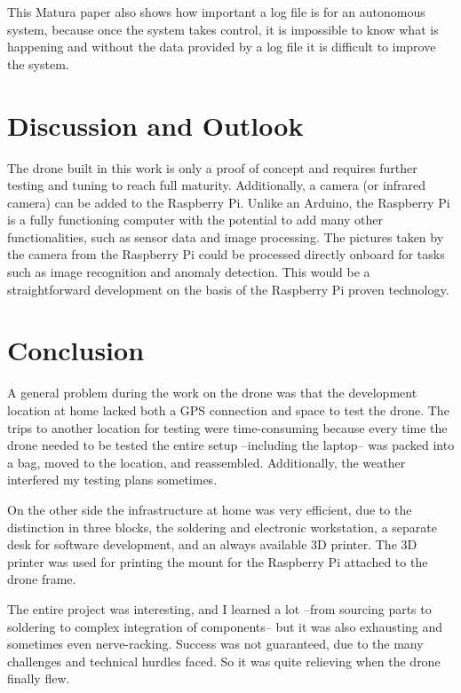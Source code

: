 \documentclass[svgnames]{article}
\begin{document}
	This Matura paper also shows how important a log file is for an autonomous system, because once the system takes  control, it is impossible to know what is happening and without the data provided by a log file it is difficult to improve the system.
	
	\section{Discussion and Outlook}
	 The drone built in this work is only a proof of concept and requires further testing and tuning to reach full maturity. Additionally, a camera (or infrared camera) can be added to the Raspberry Pi. Unlike an Arduino, the Raspberry Pi is a fully functioning computer with the potential to add many other functionalities, such as sensor data and image processing. The pictures taken by the camera from the Raspberry Pi could be processed directly onboard for tasks such as image recognition and anomaly detection. This would be a straightforward development on the basis of the Raspberry Pi proven technology.
	
	
	\section{Conclusion}
	A general problem during the work on the drone was that the development location at home lacked both a \gls{GPS} connection and space to test the drone. The trips to another location for testing were time-consuming because every time the drone needed to be tested the entire setup  --including the laptop-- was packed into a bag, moved to the location, and reassembled. Additionally, the weather interfered my testing plans sometimes.
	
	On the other side the infrastructure at home was very efficient, due to the distinction in three blocks, the soldering and electronic workstation, a separate desk for software development, and an always available 3D printer. The 3D printer was used for printing the mount for the Raspberry Pi attached to the drone frame.
	
	The entire project was interesting, and I learned a lot --from sourcing parts to soldering to complex integration of components-- but it was also exhausting and sometimes even nerve-racking. Success was not guaranteed, due to the many challenges and technical hurdles faced. So it was quite relieving when the drone finally flew.
	

	
	\newpage
	\setcounter{section}{0}
	\renewcommand{\thesubsection}{\Alph{subsection}}
	\renewcommand{\thesection}{\Alph{section}}
	\newpage
	\appendix
	\appendixpage
\end{document}
